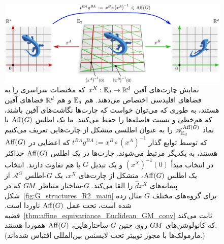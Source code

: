 \begin{figure}
	\centering
	\includegraphics[width=1.\textwidth]{figures/affine_charts.pdf}
	\vspace*{2ex}
	\caption{\small
		نمایش چارت‌های آفین $x^X: \mathbb{E}_d \to \mathbb{R}^d$ که مختصات سراسری را به فضاهای اقلیدسی اختصاص می‌دهند.
		هم $\mathbb{E}_d$ و هم $\mathbb{R}^d$ فضاهای آفین هستند، به طوری که می‌توان خواست که چارت‌ها نگاشت‌های آفین باشند، که هم‌خطی و نسبت فاصله‌ها را حفظ می‌کنند.
		ما یک اطلس $\operatorname{Aff}(G)$ با نماد $\mathscr{A}^{\operatorname{Aff}(G)}_{\mathbb{E}_d}$ را به عنوان اطلسی متشکل از چارت‌هایی تعریف می‌کنیم که توسط توابع گذار $t^{BA} g^{BA} := x^B \circ (x^A)^{-1}$ که اعضایی در $\operatorname{Aff}(G)$ هستند، به یکدیگر مرتبط می‌شوند.
		چارت‌ها در یک اطلس $\operatorname{Aff}(G)$ حداکثر در انتخاب مبدأ $(x^X)^{-1}(0)$ و یک تبدیل $G$ با هم تفاوت دارند.
		انتخاب یک اطلس $\operatorname{Aff}(G)$، متشکل از چارت‌های $x^X$، یک $G$-اطلس $\mathscr{A}^G$ از پیمانه‌های $\hat{d}x^X$ را القا می‌کند.
		$G$-ساختار متناظر $G\mkern-1.4muM$ که در شکل~\ref{fig:G_structures_R2_main} برای گروه‌های مختلف $G$ مثال زده شده است، تحت عمل $\operatorname{Aff}(G)$ ناوردا است.
		قضیه~\ref{thm:affine_equivariance_Euclidean_GM_conv} ثابت می‌کند که کانولوشن‌های $G\mkern-1.4muM$ روی چنین $G$-ساختارهایی، $\operatorname{Aff}(G)$-هموردا هستند.
		{\\
			\color{gray}
			\scriptsize
			(مارمولک‌ها با مجوز توییتر تحت لایسنس بین‌المللی 
			\href{https://github.com/twitter/twemoji/blob/gh-pages/LICENSE-GRAPHICS}{\underline{}}
			اقتباس شده‌اند.)
		}
	}
	\label{fig:affine_charts}
\end{figure}


